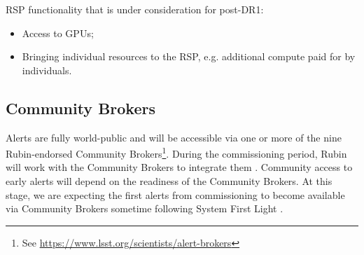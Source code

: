 RSP functionality that is under consideration for post-DR1:
\begin{itemize}
\item Access to GPUs;
\item Bringing individual resources to the RSP, e.g. additional compute paid for by individuals.
\end{itemize} 

\subsection{Community Brokers}
\label{ssec:brokers}
Alerts are fully world-public and will be accessible via one or more of the nine Rubin-endorsed Community Brokers\footnote{See \url{https://www.lsst.org/scientists/alert-brokers}}.
During the commissioning period, Rubin will work with the Community Brokers to integrate them .
Community access to early alerts will depend on the readiness of the Community Brokers. 
At this stage, we are expecting the first alerts from commissioning to become available via Community Brokers sometime following System First Light . 
